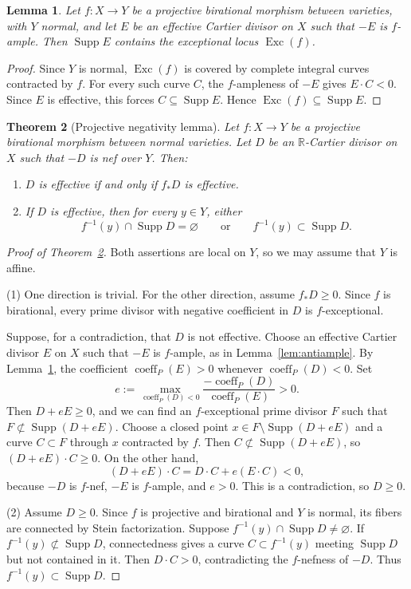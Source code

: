 \documentclass[12pt,a4paper,psamsfonts]{amsart}
\theoremstyle{plain}
\newtheorem{theorem}{Theorem}[section]
\newtheorem{lemma}[theorem]{Lemma}
\theoremstyle{definition}
\newcommand{\R}{\mathbb R}
\DeclareMathOperator{\Supp}{Supp}
\DeclareMathOperator{\coeff}{coeff}
\begin{document}
\begin{lemma}\label{lem:exceptional-support}
Let $f\colon X\to Y$ be a projective birational morphism between
varieties, with $Y$ normal, and let $E$ be an effective Cartier
divisor on $X$ such that $-E$ is $f$-ample. Then $\Supp E$ contains
the exceptional locus $\operatorname{Exc}(f)$.
\end{lemma}

\begin{proof}
Since $Y$ is normal, $\operatorname{Exc}(f)$ is covered by complete
integral curves contracted by $f$. For every such curve $C$, the
$f$-ampleness of $-E$ gives $E\cdot C<0$. Since $E$ is effective,
this forces $C\subseteq\Supp E$. Hence
$\operatorname{Exc}(f)\subseteq\Supp E$.
\end{proof}

\begin{theorem}[Projective negativity lemma]\label{thm:negativity}
Let $f\colon X\to Y$ be a projective birational morphism between normal
varieties. Let $D$ be an $\R$-Cartier divisor on $X$ such that $-D$ is
nef over $Y$. Then:
\begin{enumerate}
\item $D$ is effective if and only if $f_*D$ is effective.
\item If $D$ is effective, then for every $y\in Y$, either
\[
f^{-1}(y)\cap\Supp D=\varnothing
\qquad\text{or}\qquad
f^{-1}(y)\subset\Supp D.
\]
\end{enumerate}
\end{theorem}

\begin{proof}[Proof of Theorem~\ref{thm:negativity}]
Both assertions are local on $Y$, so we may assume that $Y$ is affine.

\textup{(1)}
One direction is trivial. For the other direction, assume $f_*D\geq0$.
Since $f$ is birational, every prime divisor with negative coefficient
in $D$ is $f$-exceptional.

Suppose, for a contradiction, that $D$ is not effective. Choose an effective
Cartier divisor $E$ on $X$ such that $-E$ is $f$-ample, as in
Lemma~\ref{lem:antiample}. By Lemma~\ref{lem:exceptional-support},
the coefficient $\coeff_P(E)>0$ whenever $\coeff_P(D)<0$. Set
\[
e:=\max_{\coeff_P(D)<0}\frac{-\coeff_P(D)}{\coeff_P(E)}>0.
\]
Then $D+eE\geq0$, and we can find an $f$-exceptional prime
divisor $F$ such that $F\not\subset\Supp(D+eE)$.
Choose a closed point $x\in F\setminus\Supp(D+eE)$ and a
curve $C\subset F$ through $x$ contracted by $f$.
Then $C\not\subset\Supp(D+eE)$, so $(D+eE)\cdot C\geq0$.
On the other hand,
\[
(D+eE)\cdot C=D\cdot C+e(E\cdot C)<0,
\]
because $-D$ is $f$-nef, $-E$ is $f$-ample, and $e>0$. This is a
contradiction, so $D\geq0$.

\textup{(2)}
Assume $D\geq0$. Since $f$ is projective and birational and $Y$ is
normal, its fibers are connected by Stein factorization.
Suppose $f^{-1}(y)\cap\Supp D\neq\varnothing$. If
$f^{-1}(y)\not\subset\Supp D$, connectedness gives a curve
$C\subset f^{-1}(y)$ meeting $\Supp D$ but not contained in it.
Then $D\cdot C>0$, contradicting the $f$-nefness of $-D$.
Thus $f^{-1}(y)\subset\Supp D$.
\end{proof}
\end{document}
